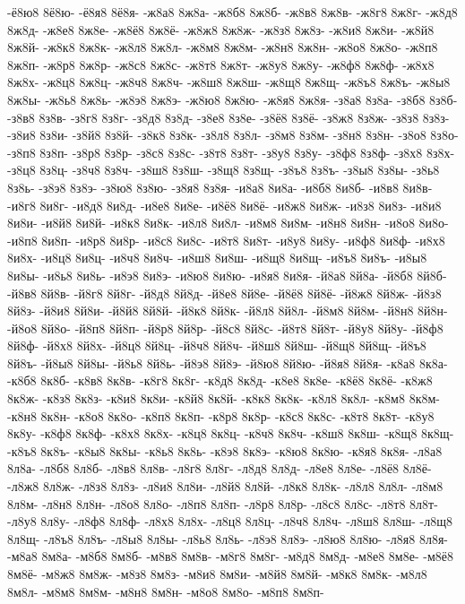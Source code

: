 {-ё8ю8
8ё8ю-
-ё8я8
8ё8я-
-ж8а8
8ж8а-
-ж8б8
8ж8б-
-ж8в8
8ж8в-
-ж8г8
8ж8г-
-ж8д8
8ж8д-
-ж8е8
8ж8е-
-ж8ё8
8ж8ё-
-ж8ж8
8ж8ж-
-ж8з8
8ж8з-
-ж8и8
8ж8и-
-ж8й8
8ж8й-
-ж8к8
8ж8к-
-ж8л8
8ж8л-
-ж8м8
8ж8м-
-ж8н8
8ж8н-
-ж8о8
8ж8о-
-ж8п8
8ж8п-
-ж8р8
8ж8р-
-ж8с8
8ж8с-
-ж8т8
8ж8т-
-ж8у8
8ж8у-
-ж8ф8
8ж8ф-
-ж8х8
8ж8х-
-ж8ц8
8ж8ц-
-ж8ч8
8ж8ч-
-ж8ш8
8ж8ш-
-ж8щ8
8ж8щ-
-ж8ъ8
8ж8ъ-
-ж8ы8
8ж8ы-
-ж8ь8
8ж8ь-
-ж8э8
8ж8э-
-ж8ю8
8ж8ю-
-ж8я8
8ж8я-
-з8а8
8з8а-
-з8б8
8з8б-
-з8в8
8з8в-
-з8г8
8з8г-
-з8д8
8з8д-
-з8е8
8з8е-
-з8ё8
8з8ё-
-з8ж8
8з8ж-
-з8з8
8з8з-
-з8и8
8з8и-
-з8й8
8з8й-
-з8к8
8з8к-
-з8л8
8з8л-
-з8м8
8з8м-
-з8н8
8з8н-
-з8о8
8з8о-
-з8п8
8з8п-
-з8р8
8з8р-
-з8с8
8з8с-
-з8т8
8з8т-
-з8у8
8з8у-
-з8ф8
8з8ф-
-з8х8
8з8х-
-з8ц8
8з8ц-
-з8ч8
8з8ч-
-з8ш8
8з8ш-
-з8щ8
8з8щ-
-з8ъ8
8з8ъ-
-з8ы8
8з8ы-
-з8ь8
8з8ь-
-з8э8
8з8э-
-з8ю8
8з8ю-
-з8я8
8з8я-
-и8а8
8и8а-
-и8б8
8и8б-
-и8в8
8и8в-
-и8г8
8и8г-
-и8д8
8и8д-
-и8е8
8и8е-
-и8ё8
8и8ё-
-и8ж8
8и8ж-
-и8з8
8и8з-
-и8и8
8и8и-
-и8й8
8и8й-
-и8к8
8и8к-
-и8л8
8и8л-
-и8м8
8и8м-
-и8н8
8и8н-
-и8о8
8и8о-
-и8п8
8и8п-
-и8р8
8и8р-
-и8с8
8и8с-
-и8т8
8и8т-
-и8у8
8и8у-
-и8ф8
8и8ф-
-и8х8
8и8х-
-и8ц8
8и8ц-
-и8ч8
8и8ч-
-и8ш8
8и8ш-
-и8щ8
8и8щ-
-и8ъ8
8и8ъ-
-и8ы8
8и8ы-
-и8ь8
8и8ь-
-и8э8
8и8э-
-и8ю8
8и8ю-
-и8я8
8и8я-
-й8а8
8й8а-
-й8б8
8й8б-
-й8в8
8й8в-
-й8г8
8й8г-
-й8д8
8й8д-
-й8е8
8й8е-
-й8ё8
8й8ё-
-й8ж8
8й8ж-
-й8з8
8й8з-
-й8и8
8й8и-
-й8й8
8й8й-
-й8к8
8й8к-
-й8л8
8й8л-
-й8м8
8й8м-
-й8н8
8й8н-
-й8о8
8й8о-
-й8п8
8й8п-
-й8р8
8й8р-
-й8с8
8й8с-
-й8т8
8й8т-
-й8у8
8й8у-
-й8ф8
8й8ф-
-й8х8
8й8х-
-й8ц8
8й8ц-
-й8ч8
8й8ч-
-й8ш8
8й8ш-
-й8щ8
8й8щ-
-й8ъ8
8й8ъ-
-й8ы8
8й8ы-
-й8ь8
8й8ь-
-й8э8
8й8э-
-й8ю8
8й8ю-
-й8я8
8й8я-
-к8а8
8к8а-
-к8б8
8к8б-
-к8в8
8к8в-
-к8г8
8к8г-
-к8д8
8к8д-
-к8е8
8к8е-
-к8ё8
8к8ё-
-к8ж8
8к8ж-
-к8з8
8к8з-
-к8и8
8к8и-
-к8й8
8к8й-
-к8к8
8к8к-
-к8л8
8к8л-
-к8м8
8к8м-
-к8н8
8к8н-
-к8о8
8к8о-
-к8п8
8к8п-
-к8р8
8к8р-
-к8с8
8к8с-
-к8т8
8к8т-
-к8у8
8к8у-
-к8ф8
8к8ф-
-к8х8
8к8х-
-к8ц8
8к8ц-
-к8ч8
8к8ч-
-к8ш8
8к8ш-
-к8щ8
8к8щ-
-к8ъ8
8к8ъ-
-к8ы8
8к8ы-
-к8ь8
8к8ь-
-к8э8
8к8э-
-к8ю8
8к8ю-
-к8я8
8к8я-
-л8а8
8л8а-
-л8б8
8л8б-
-л8в8
8л8в-
-л8г8
8л8г-
-л8д8
8л8д-
-л8е8
8л8е-
-л8ё8
8л8ё-
-л8ж8
8л8ж-
-л8з8
8л8з-
-л8и8
8л8и-
-л8й8
8л8й-
-л8к8
8л8к-
-л8л8
8л8л-
-л8м8
8л8м-
-л8н8
8л8н-
-л8о8
8л8о-
-л8п8
8л8п-
-л8р8
8л8р-
-л8с8
8л8с-
-л8т8
8л8т-
-л8у8
8л8у-
-л8ф8
8л8ф-
-л8х8
8л8х-
-л8ц8
8л8ц-
-л8ч8
8л8ч-
-л8ш8
8л8ш-
-л8щ8
8л8щ-
-л8ъ8
8л8ъ-
-л8ы8
8л8ы-
-л8ь8
8л8ь-
-л8э8
8л8э-
-л8ю8
8л8ю-
-л8я8
8л8я-
-м8а8
8м8а-
-м8б8
8м8б-
-м8в8
8м8в-
-м8г8
8м8г-
-м8д8
8м8д-
-м8е8
8м8е-
-м8ё8
8м8ё-
-м8ж8
8м8ж-
-м8з8
8м8з-
-м8и8
8м8и-
-м8й8
8м8й-
-м8к8
8м8к-
-м8л8
8м8л-
-м8м8
8м8м-
-м8н8
8м8н-
-м8о8
8м8о-
-м8п8
8м8п-
}
